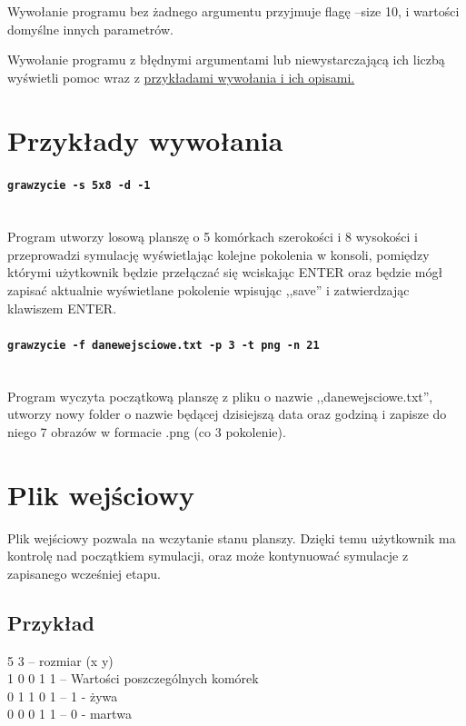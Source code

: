 \documentclass{report}
\begin{document}
Wywołanie programu bez żadnego argumentu przyjmuje flagę --size 10, i wartości domyślne innych parametrów.

Wywołanie programu z błędnymi argumentami lub niewystarczającą ich liczbą wyświetli pomoc wraz z   \hyperref[przyklady]{\textcolor{LinkColor}{przykładami wywołania i ich opisami.}}

\section{Przykłady wywołania}  \label{przyklady}
\paragraph{\texttt{gra\textunderscore{}w\textunderscore{}zycie -s 5x8 -d -1}} \mbox{} \\
Program utworzy losową planszę o 5 komórkach szerokości i 8 wysokości i przeprowadzi symulację wyświetlając kolejne pokolenia w konsoli, pomiędzy którymi użytkownik będzie przełączać się wciskając ENTER oraz będzie mógł zapisać aktualnie wyświetlane pokolenie wpisując ,,save'' i zatwierdzając klawiszem ENTER.

\paragraph{\texttt{gra\textunderscore{}w\textunderscore{}zycie -f dane\textunderscore{}wejsciowe.txt -p 3 -t png -n 21}} \mbox{} \\
Program wyczyta początkową planszę z pliku o nazwie ,,dane\textunderscore{}wejsciowe.txt'', utworzy nowy folder o nazwie będącej dzisiejszą data oraz godziną i zapisze do niego 7 obrazów w formacie .png (co 3 pokolenie). 

\section{Plik wejściowy}  \label{format}
Plik wejściowy pozwala na wczytanie stanu planszy. Dzięki temu użytkownik ma kontrolę nad początkiem symulacji, oraz może kontynuować symulacje z zapisanego wcześniej etapu.

\subsection{Przykład}
5 3 \tab -- rozmiar (x y) \\
1 0 0 1 1 \tab -- Wartości poszczególnych komórek \\
0 1 1 0 1 \tab -- 1 - żywa \\
0 0 0 1 1 \tab -- 0 - martwa \\
\end{document}
